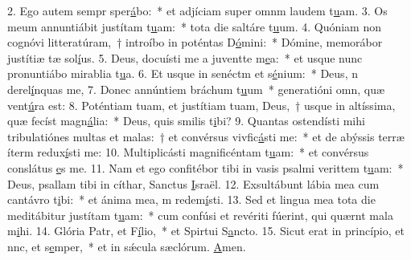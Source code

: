 2. Ego autem sempr sper\uline{á}bo:~* et adjíciam super omnm laudem t\uline{u}am.
3. Os meum annuntiábit justítam t\uline{u}am:~* tota die saltáre t\uline{u}um.
4. Quóniam non cognóvi litteratúram,~† introíbo in poténtas D\uline{ó}mini:~* Dómine, memorábor justítiæ tæ sol\uline{í}us.
5. Deus, docuísti me a juventte m\uline{e}a:~* et usque nunc pronuntiábo mirablia t\uline{u}a.
6. Et usque in senéctm et s\uline{é}nium:~* Deus, n derel\uline{í}nquas me,
7. Donec annúntiem bráchum t\uline{u}um~* generatióni omn, quæ vent\uline{ú}ra est:
8. Poténtiam tuam, et justítiam tuam, Deus,~† usque in altíssima, quæ fecíst magn\uline{á}lia:~* Deus, quis smilis t\uline{i}bi?
9. Quantas ostendísti mihi tribulatiónes multas et malas:~† et convérsus vivfic\uline{á}sti me:~* et de abýssis terræ íterm redux\uline{í}sti me:
10. Multiplicásti magnificéntam t\uline{u}am:~* et convérsus conslátus \uline{e}s me.
11. Nam et ego confitébor tibi in vasis psalmi verittem t\uline{u}am:~* Deus, psallam tibi in cíthar, Sanctus \uline{I}sraël.
12. Exsultábunt lábia mea cum cantávro t\uline{i}bi:~* et ánima mea, m redem\uline{í}sti.
13. Sed et lingua mea tota die meditábitur justítam t\uline{u}am:~* cum confúsi et revériti fúerint, qui quærnt mala m\uline{i}hi.
14. Glória Patr, et F\uline{í}lio,~* et Spirtui S\uline{a}ncto.
15. Sicut erat in princípio, et nnc, et s\uline{e}mper,~* et in sǽcula sæclórum. \uline{A}men.
